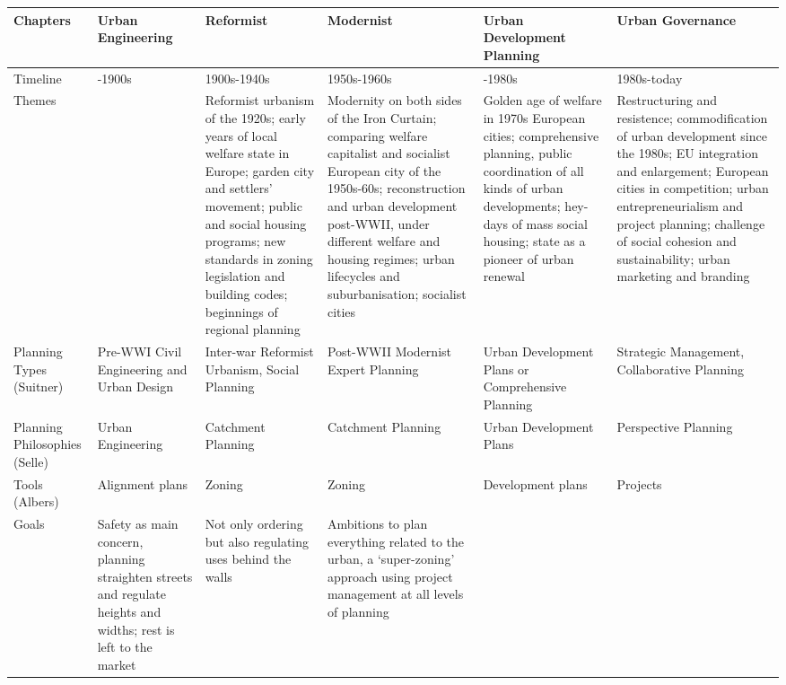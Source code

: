 \documentclass{article}
\begin{document}
\begin{tabularx}{1.2\textwidth} { 
  | >{\raggedright\arraybackslash}X
  | >{\raggedright\arraybackslash}X 
  | >{\raggedright\arraybackslash}X 
  | >{\raggedright\arraybackslash}X
  | >{\raggedright\arraybackslash}X 
  | >{\raggedright\arraybackslash}X | }
  \hline
  Chapters
  & \textbf{Urban Engineering}
   & \textbf{Reformist} 
   & \textbf{Modernist} 
   & \textbf{Urban Development Planning}
   & \textbf{Urban Governance} \\
  \hline
  Timeline
  & 1860-1900s
  & 1900s-1940s
  & 1950s-1960s
  & 1960-1980s
  & 1980s-today \\ 
  \hline
  Themes
  & 
   & Reformist urbanism of the 1920s; early years of local welfare state in Europe; garden city and settlers' movement; public and social housing programs; new standards in zoning legislation and building codes; beginnings of regional planning 
   & Modernity on both sides of the Iron Curtain; comparing welfare capitalist and socialist European city of the 1950s-60s; reconstruction and urban development post-WWII, under different welfare and housing regimes; urban lifecycles and suburbanisation; socialist cities
   & Golden age of welfare in 1970s European cities; comprehensive planning, public coordination of all kinds of urban developments; hey-days of mass social housing; state as a pioneer of urban renewal
   & Restructuring and resistence; commodification of urban development since the 1980s; EU integration and enlargement; European cities in competition; urban entrepreneurialism and project planning; challenge of social cohesion and sustainability; urban marketing and branding \\
  \hline
  Planning Types (Suitner)
  & Pre-WWI Civil Engineering and Urban Design
   & Inter-war Reformist Urbanism, Social Planning
   & Post-WWII Modernist Expert Planning
   & Urban Development Plans or Comprehensive Planning
   & Strategic Management, Collaborative Planning \\
  \hline
  Planning Philosophies (Selle)
   & Urban Engineering
   & Catchment Planning
   & Catchment Planning
   & Urban Development Plans
   & Perspective Planning \\
      \hline
  Tools (Albers)
  & Alignment plans
  & Zoning
  & Zoning
  & Development plans
  & Projects \\
      \hline
  Goals
  & Safety as main concern, planning straighten streets and regulate heights and widths; rest is left to the market
  & Not only ordering but also regulating uses behind the walls
  & Ambitions to plan everything related to the urban, a `super-zoning' approach using project management at all levels of planning
  & 
  &  \\
   \hline
\end{tabularx}
\end{document}
